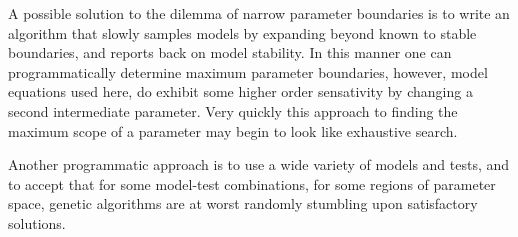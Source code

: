 A possible solution to the dilemma of narrow parameter boundaries is to write an algorithm that slowly samples models by expanding beyond known to stable boundaries, and reports back on model stability. In this manner one can programmatically determine maximum parameter boundaries, however, model equations used here, do exhibit some higher order sensativity by changing a second intermediate parameter. Very quickly this approach to finding the maximum scope of a parameter may begin to look like exhaustive search.

Another programmatic approach is to use a wide variety of models and tests, and to accept that for some model-test combinations, for some regions of parameter space, genetic algorithms are at worst randomly stumbling upon satisfactory solutions.
